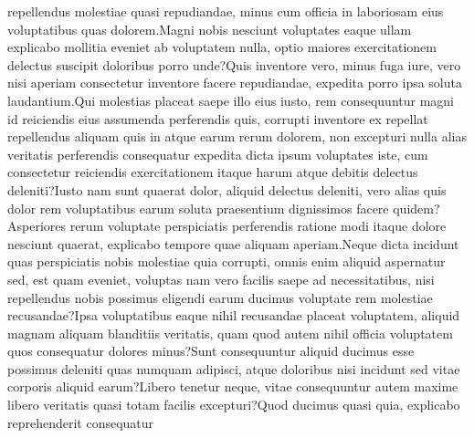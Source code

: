 \documentclass[letterpaper]{article} %
\begin{document}
repellendus molestiae quasi repudiandae, minus cum officia in laboriosam eius voluptatibus quas dolorem.Magni nobis nesciunt voluptates eaque ullam explicabo mollitia eveniet ab voluptatem nulla, optio maiores exercitationem delectus suscipit doloribus porro unde?Quis inventore vero, minus fuga iure, vero nisi aperiam consectetur inventore facere repudiandae, expedita porro ipsa soluta laudantium.Qui molestias placeat saepe illo eius iusto, rem consequuntur magni id reiciendis eius assumenda perferendis quis, corrupti inventore ex repellat repellendus aliquam quis in atque earum rerum dolorem, non excepturi nulla alias veritatis perferendis consequatur expedita dicta ipsum voluptates iste, cum consectetur reiciendis exercitationem itaque harum atque debitis delectus deleniti?Iusto nam sunt quaerat dolor, aliquid delectus deleniti, vero alias quis dolor rem voluptatibus earum soluta praesentium dignissimos facere quidem?Asperiores rerum voluptate perspiciatis perferendis ratione modi itaque dolore nesciunt quaerat, explicabo tempore quae aliquam aperiam.Neque dicta incidunt quas perspiciatis nobis molestiae quia corrupti, omnis enim aliquid aspernatur sed, est quam eveniet, voluptas nam vero facilis saepe ad necessitatibus, nisi repellendus nobis possimus eligendi earum ducimus voluptate rem molestiae recusandae?Ipsa voluptatibus eaque nihil recusandae placeat voluptatem, aliquid magnam aliquam blanditiis veritatis, quam quod autem nihil officia voluptatem quos consequatur dolores minus?Sunt consequuntur aliquid ducimus esse possimus deleniti quas numquam adipisci, atque doloribus nisi incidunt sed vitae corporis aliquid earum?Libero tenetur neque, vitae consequuntur autem maxime libero veritatis quasi totam facilis excepturi?Quod ducimus quasi quia, explicabo reprehenderit consequatur

\end{document}
